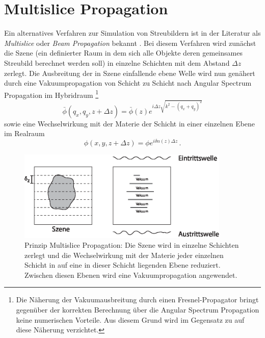 \section{Multislice Propagation}
Ein alternatives Verfahren zur Simulation von Streubildern ist in der Literatur als \textit{Multislice} oder \textit{Beam Propagation} bekannt \cite{hare1994,cowley1957}. Bei diesem Verfahren wird zunächst die Szene (ein definierter Raum in dem sich alle Objekte deren gemeinsames Streubild berechnet werden soll) in einzelne Schichten mit dem Abstand $\Delta z$zerlegt.
Die Ausbreitung der in Szene einfallende ebene Welle wird nun genähert durch eine Vakuumpropagation von Schicht zu Schicht nach Angular Spectrum Propagation im Hybridraum \footnote{Die Näherung der Vakuumausbreitung durch einen Fresnel-Propagator bringt gegenüber der korrekten Berechnung über die Angular Spectrum Propagation keine numerischen Vorteile. Aus diesem Grund wird im Gegensatz zu \cite{hare1994} auf diese Näherung verzichtet.}
\begin{equation}
	\bar{\phi}\left(q_x,q_y,z+\Delta z\right)=\bar{\phi}(z)e^{i\Delta z\sqrt{k^2-(q_x+q_y)^2}}
\end{equation}
sowie eine Wechselwirkung mit der Materie der Schicht in einer einzelnen Ebene im Realraum
\begin{equation}
	\phi(x,y,z+\Delta z)=\phi e^{i\delta n\left(z\right) \Delta z} \, .
\end{equation}
\begin{figure}
	\centering
	\includegraphics[width=0.9\textwidth]{images/multislice.eps}
	\caption[Prinzip Multislice Propagation]{Prinzip Multislice Propagation: Die Szene wird in einzelne Schichten zerlegt und die Wechselwirkung mit der Materie jeder einzelnen Schicht in auf eine in dieser Schicht liegenden Ebene reduziert. Zwischen diesen Ebenen wird eine Vakuumpropagation angewendet.}
	\label{fig:multislice}
\end{figure} 	

